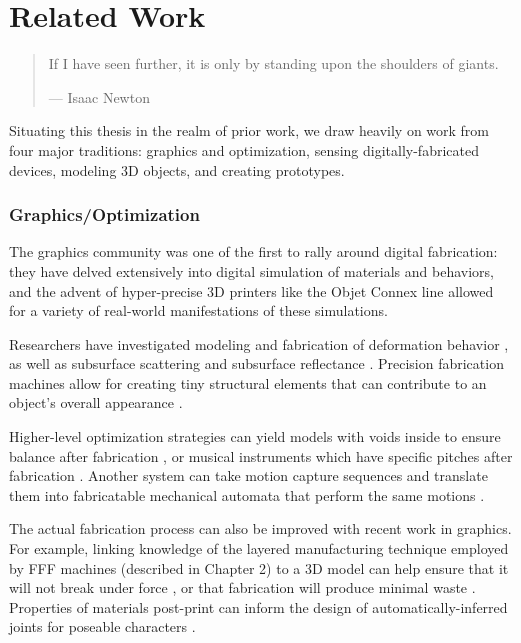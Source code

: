 \chapter{Related Work}

\begin{quote}
If I have seen further, it is only by standing upon the shoulders of giants.

--- Isaac Newton
\end{quote}

Situating this thesis in the realm of prior work, we draw heavily on work from four major traditions: graphics and optimization, sensing digitally-fabricated devices, modeling 3D objects, and creating prototypes.

\subsection{Graphics/Optimization}
    
    The graphics community was one of the first to rally around digital fabrication: they have delved extensively into digital simulation of materials and behaviors, and the advent of hyper-precise 3D printers like the Objet Connex line allowed for a variety of real-world manifestations of these simulations.
    
    Researchers have investigated modeling and fabrication of deformation behavior \cite{bickel-deformation}, as well as subsurface scattering \cite{hasan-subsurface} and subsurface reflectance \cite{weyrich-reflectance}. Precision fabrication machines allow for creating tiny structural elements that can contribute to an object's overall appearance \cite{lan-appearance}.
    
    Higher-level optimization strategies can yield models with voids inside to ensure balance after fabrication \cite{prevost-makeitstand}, or musical instruments which have specific pitches after fabrication \cite{umetani-metallophone}. Another system can take motion capture sequences and translate them into fabricatable mechanical automata that perform the same motions \cite{ceylan-automata}.
    
    The actual fabrication process can also be improved with recent work in graphics. For example, linking knowledge of the layered manufacturing technique employed by FFF machines (described in Chapter 2) to a 3D model can help ensure that it will not break under force \cite{umetani-strength}, or that fabrication will produce minimal waste \cite{schmidt-support}. Properties of materials post-print can inform the design of automatically-inferred joints for poseable characters \cite{bacher-posable,cali-articulated}.
    
